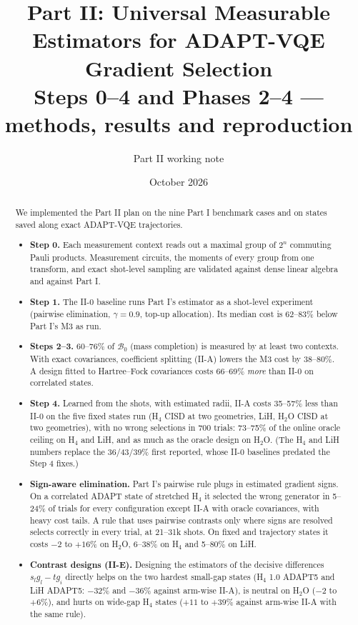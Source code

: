\documentclass[10.5pt]{article}
\title{Part II: Universal Measurable Estimators for ADAPT-VQE Gradient Selection\\[2pt]
\large Steps 0--4 and Phases 2--4 --- methods, results and reproduction}
\author{Part II working note}
\date{October 2026}
\begin{document}
\maketitle

\begin{abstract}
We implemented the Part II plan on the nine Part I benchmark cases and on states saved along exact ADAPT-VQE trajectories.

\begin{itemize}[leftmargin=1.2em]
  \item \textbf{Step 0.} Each measurement context reads out a maximal group of $2^n$ commuting Pauli products. Measurement circuits, the moments of every group from one transform, and exact shot-level sampling are validated against dense linear algebra and against Part I.
  \item \textbf{Step 1.} The II-0 baseline runs Part I's estimator as a shot-level experiment (pairwise elimination, $\gamma=0.9$, top-up allocation). Its median cost is 62--83\% below Part I's M3 as run.
  \item \textbf{Steps 2--3.} 60--76\% of $\mathcal B_0$ (mass completion) is measured by at least two contexts. With exact covariances, coefficient splitting (II-A) lowers the M3 cost by 38--80\%. A design fitted to Hartree--Fock covariances costs 66--69\% \emph{more} than II-0 on correlated states.
  \item \textbf{Step 4.} Learned from the shots, with estimated radii, II-A costs 35--57\% less than II-0 on the five fixed states run (H$_4$ CISD at two geometries, LiH, H$_2$O CISD at two geometries), with no wrong selections in 700 trials: 73--75\% of the online oracle ceiling on H$_4$ and LiH, and as much as the oracle design on H$_2$O. (The H$_4$ and LiH numbers replace the 36/43/39\% first reported, whose II-0 baselines predated the Step 4 fixes.)
  \item \textbf{Sign-aware elimination.} Part I's pairwise rule plugs in estimated gradient signs. On a correlated ADAPT state of stretched H$_4$ it selected the wrong generator in 5--24\% of trials for every configuration except II-A with oracle covariances, with heavy cost tails. A rule that uses pairwise contrasts only where signs are resolved selects correctly in every trial, at 21--31k shots. On fixed and trajectory states it costs $-2$ to $+16\%$ on H$_2$O, 6--38\% on H$_4$ and 5--80\% on LiH.
  \item \textbf{Contrast designs (II-E).} Designing the estimators of the decisive differences $s_lg_l-tg_i$ directly helps on the two hardest small-gap states (H$_4$ 1.0 ADAPT5 and LiH ADAPT5: $-32\%$ and $-36\%$ against arm-wise II-A), is neutral on H$_2$O ($-2$ to $+6\%$), and hurts on wide-gap H$_4$ states ($+11$ to $+39\%$ against arm-wise II-A with the same rule).

\end{itemize}
\end{abstract}
\end{document}
